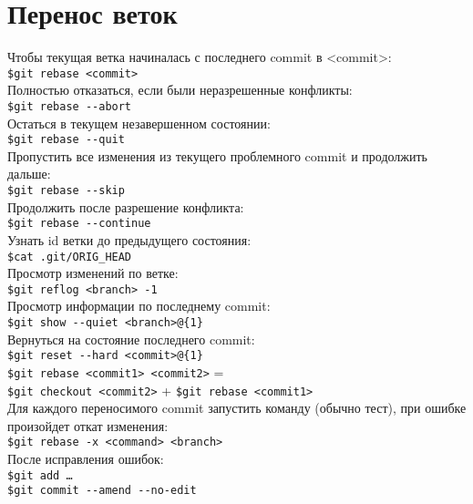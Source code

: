 \section{Перенос веток}

Чтобы текущая ветка начиналась с последнего commit в <commit>: \\
\indent\texttt{\$git rebase <commit>} \\
Полностью отказаться, если были неразрешенные конфликты: \\
\indent\texttt{\$git rebase {-}-abort} \\
Остаться в текущем незавершенном состоянии: \\
\indent\texttt{\$git rebase {-}-quit}  \\
Пропустить все изменения из текущего проблемного commit и продолжить дальше: \\
\indent\texttt{\$git rebase {-}-skip } \\


\noindent Продолжить после разрешение конфликта: \\
\indent\texttt{\$git rebase {-}-continue } \\
Узнать id ветки до предыдущего состояния: \\ 
\indent\texttt{\$cat .git/ORIG\_HEAD } \\
Просмотр изменений по ветке: \\
\indent\texttt{\$git reflog <branch> -1}  \\
Просмотр информации по последнему commit: \\
\indent\texttt{\$git show {-}-quiet <branch>{@}\{1\}} \\ 
Вернуться на состояние последнего commit: \\
\indent\texttt{\$git reset {-}-hard <commit>{@}\{1\}} \\ 


\noindent\texttt{\$git rebase <commit1> <commit2>} = \\
\indent\indent \texttt{\$git checkout <commit2>} + \texttt{\$git rebase <commit1>} \\

\noindent Для каждого переносимого commit запустить команду (обычно тест), при ошибке произойдет откат изменения: \\
\indent\texttt{\$git rebase -x <command> <branch>} \\
\noindent После исправления ошибок: \\
\indent\texttt{\$git add \ldots} \\
\indent\texttt{\$git commit {-}-amend {-}-no-edit} \\

